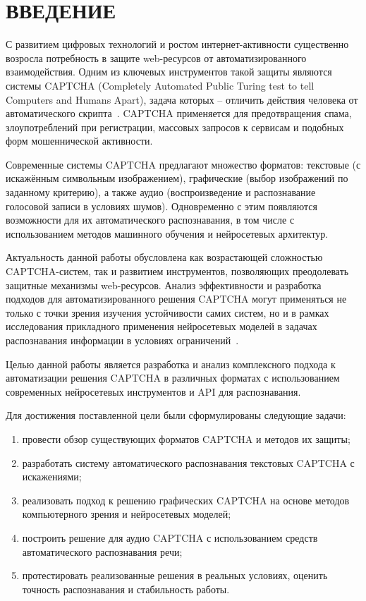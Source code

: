 \chapter*{ВВЕДЕНИЕ}

С развитием цифровых технологий и ростом интернет-активности существенно возросла 
потребность в защите web-ресурсов от автоматизированного взаимодействия. Одним 
из ключевых инструментов такой защиты являются системы CAPTCHA (Completely 
Automated Public Turing test to tell Computers and Humans Apart), задача которых 
-- отличить действия человека от автоматического скрипта~\cite{captchawiki}. 
CAPTCHA применяется для предотвращения спама, злоупотреблений при регистрации, 
массовых запросов к сервисам и подобных форм мошеннической активности.

Современные системы CAPTCHA предлагают множество форматов: текстовые (с 
искажённым символьным изображением), графические (выбор изображений по 
заданному критерию), а также аудио (воспроизведение и распознавание голосовой 
записи в условиях шумов). Одновременно с этим появляются возможности для их 
автоматического распознавания, в том числе с использованием методов 
машинного обучения и нейросетевых архитектур.

Актуальность данной работы обусловлена как возрастающей сложностью 
CAPTCHA-систем, так и развитием инструментов, позволяющих преодолевать защитные 
механизмы web-ресурсов. Анализ эффективности и разработка подходов для 
автоматизированного решения CAPTCHA могут применяться не только с точки зрения 
изучения устойчивости самих систем, но и в рамках исследования прикладного 
применения нейросетевых моделей в задачах распознавания информации в условиях 
ограничений~\cite{captchatrouble2}.

Целью данной работы является разработка и анализ комплексного подхода к 
автоматизации решения CAPTCHA в различных форматах с использованием современных 
нейросетевых инструментов и API для распознавания.

Для достижения поставленной цели были сформулированы следующие задачи:

\begin{enumerate}
    \item провести обзор существующих форматов CAPTCHA и методов их защиты;
    \item разработать систему автоматического распознавания текстовых CAPTCHA с 
    искажениями;
    \item реализовать подход к решению графических CAPTCHA на основе методов 
    компьютерного зрения и нейросетевых моделей;
    \item построить решение для аудио CAPTCHA с использованием средств 
    автоматического распознавания речи;
    \item протестировать реализованные решения в реальных условиях, оценить 
    точность распознавания и стабильность работы.
\end{enumerate}

